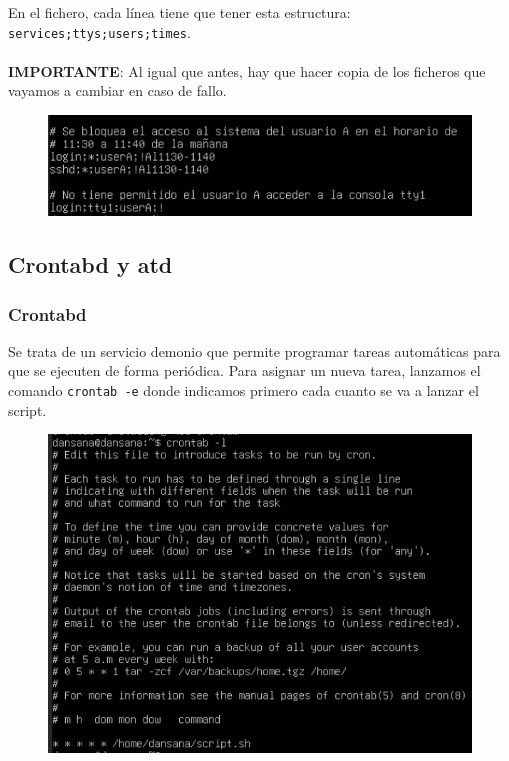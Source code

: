 \documentclass[10pt]{article}
\begin{document}
	En el fichero, cada línea tiene que tener esta estructura: \verb|services;ttys;users;times|. \\\\ \textbf{IMPORTANTE}: Al igual que antes, hay que hacer copia de los ficheros que vayamos a cambiar en caso de fallo.
	\begin{figure}[H]
		\setlength{\abovecaptionskip}{0cm}
		\setlength{\belowcaptionskip}{0cm}
		\centering
		\includegraphics[width=0.9\linewidth]{Recursos/timeConf.png}
	\end{figure}
	
	\subsection{Crontabd y atd}
	\subsubsection{Crontabd}
	Se trata de un servicio demonio que permite programar tareas automáticas para que se ejecuten de forma periódica. Para asignar un nueva tarea, lanzamos el comando \verb|crontab -e| donde indicamos primero cada cuanto se va a lanzar el script.
	\begin{figure}[H]
		\setlength{\abovecaptionskip}{0cm}
		\setlength{\belowcaptionskip}{0cm}
		\centering
		\includegraphics[width=0.7\linewidth]{Recursos/crontab.png}
	\end{figure}
	
\end{document}
